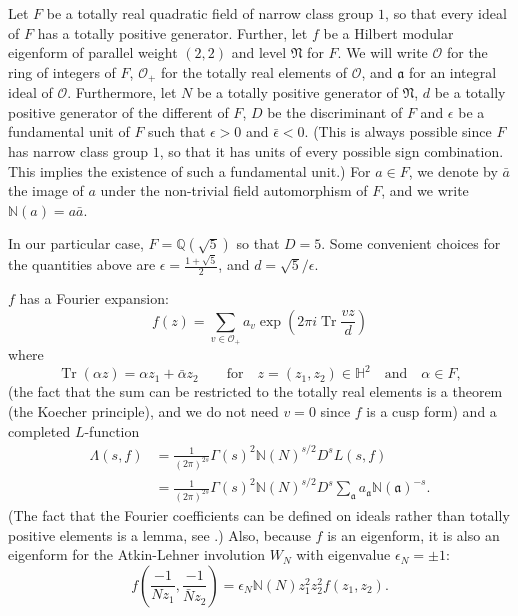 \documentclass{article}
\DeclareMathOperator{\Tr}{Tr}
\theoremstyle{plain}
\begin{document}
Let $F$ be a totally real quadratic field of narrow class group $1$, so that every ideal of $F$ has a totally positive generator. Further, let $f$ be a Hilbert modular eigenform of parallel weight $(2,2)$ and level $\mathfrak{N}$ for $F$. We will write $\mathcal{O}$ for the ring of integers of $F$, $\mathcal{O}_+$ for the totally real elements of $\mathcal{O}$, and $\mathfrak{a}$ for an integral ideal of $\mathcal{O}$. Furthermore, let $N$ be a totally positive generator of $\mathfrak{N}$, $d$ be a totally positive generator of the different of $F$, $D$ be the discriminant of $F$ and $\epsilon$ be a fundamental unit of $F$ such that $\epsilon>0$ and $\bar{\epsilon}<0$. (This is always possible since $F$ has narrow class group $1$, so that it has units of every possible sign combination. This implies the existence of such a fundamental unit.) For $a \in F$, we denote by $\bar{a}$ the image of $a$ under the non-trivial field automorphism of $F$, and we write $\mathbb{N}(a)=a\bar{a}$. 

In our particular case, $F=\mathbb{Q}(\sqrt{5})$ so that $D=5$. Some convenient choices for the quantities above are $\epsilon=\frac{1+\sqrt{5}}{2}$, and $d=\sqrt{5}/\epsilon$.

$f$ has a Fourier expansion:
\begin{equation*}
f(z)=\sum_{v \in \mathcal{O}_+} a_v \exp\left(2\pi i\Tr \frac{v z}{d}\right)
\end{equation*}
where
\begin{equation*}
\Tr(\alpha z) = \alpha z_1 + \bar{\alpha}z_2 \qquad \text{for} \quad z=(z_1, z_2) \in \mathbb{H}^2 \quad \text{and} \quad \alpha \in F,
\end{equation*}
(the fact that the sum can be restricted to the totally real elements is a theorem (the Koecher principle), and we do not need $v=0$ since $f$ is a cusp form) and a completed $L$-function
\begin{align*}
\Lambda(s,f) & = \frac{1}{(2\pi)^{2s}} \Gamma(s)^2 \mathbb{N}(N)^{s/2} D^s L(s,f)\\
&= \frac{1}{(2\pi)^{2s}} \Gamma(s)^2 \mathbb{N}(N)^{s/2} D^s \sum_{\mathfrak{a}}a_{\mathfrak{a}}\mathbb{N}(\mathfrak{a})^{-s}.
\end{align*}
(The fact that the Fourier coefficients can be defined on ideals rather than totally positive elements is a lemma, see \cite[Section 1.7]{bump}.)
Also, because $f$ is an eigenform, it is also an eigenform for the Atkin-Lehner involution $W_N$ with eigenvalue $\epsilon_N= \pm 1$:
\begin{equation*}
f\left(\frac{-1}{Nz_1},\frac{-1}{\bar{N}z_2} \right)=\epsilon_N \mathbb{N}(N)z_1^2z_2^2f(z_1, z_2).
\end{equation*}
\end{document}
